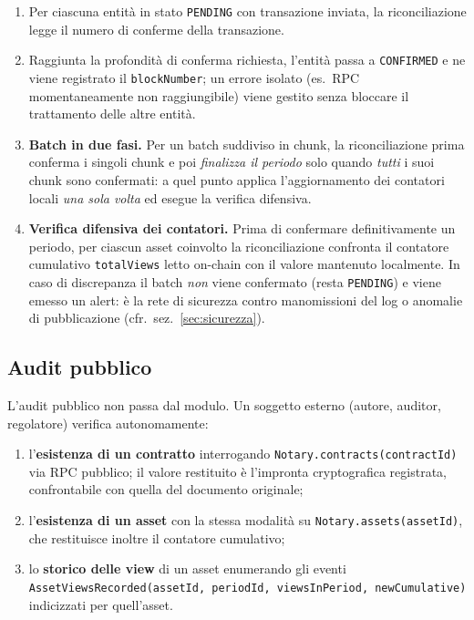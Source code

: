 \documentclass[a4paper,11pt]{article}
\begin{document}
\begin{enumerate}[leftmargin=*, itemsep=0.1em]
    \item Per ciascuna entit\`a in stato \texttt{PENDING} con transazione inviata, la riconciliazione legge il numero di conferme della transazione.
    \item Raggiunta la profondit\`a di conferma richiesta, l'entit\`a passa a \texttt{CONFIRMED} e ne viene registrato il \texttt{blockNumber}; un errore isolato (es.\ RPC momentaneamente non raggiungibile) viene gestito senza bloccare il trattamento delle altre entit\`a.
    \item \textbf{Batch in due fasi.} Per un batch suddiviso in chunk, la riconciliazione prima conferma i singoli chunk e poi \emph{finalizza il periodo} solo quando \emph{tutti} i suoi chunk sono confermati: a quel punto applica l'aggiornamento dei contatori locali \emph{una sola volta} ed esegue la verifica difensiva.
    \item \textbf{Verifica difensiva dei contatori.} Prima di confermare definitivamente un periodo, per ciascun asset coinvolto la riconciliazione confronta il contatore cumulativo \texttt{totalViews} letto on-chain con il valore mantenuto localmente. In caso di discrepanza il batch \emph{non} viene confermato (resta \texttt{PENDING}) e viene emesso un alert: \`e la rete di sicurezza contro manomissioni del log o anomalie di pubblicazione (cfr.\ sez.~\ref{sec:sicurezza}).
\end{enumerate}

\subsection{Audit pubblico}

L'audit pubblico non passa dal modulo. Un soggetto esterno (autore, auditor, regolatore) verifica autonomamente:

\begin{enumerate}[leftmargin=*, itemsep=0.1em]
    \item l'\textbf{esistenza di un contratto} interrogando \texttt{Notary.contracts(contractId)} via RPC pubblico; il valore restituito \`e l'impronta cryptografica registrata, confrontabile con quella del documento originale;
    \item l'\textbf{esistenza di un asset} con la stessa modalit\`a su \texttt{Notary.assets(assetId)}, che restituisce inoltre il contatore cumulativo;
    \item lo \textbf{storico delle view} di un asset enumerando gli eventi \texttt{AssetViewsRecorded(assetId, periodId, viewsInPeriod, newCumulative)} indicizzati per quell'asset.
\end{enumerate}
\end{document}
